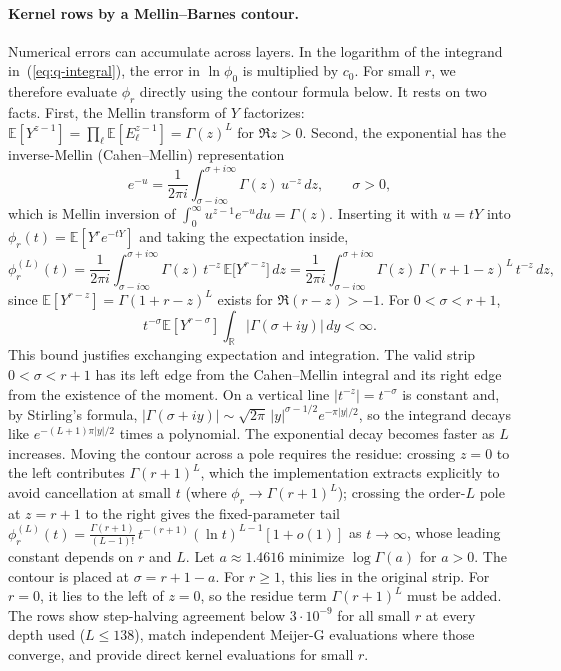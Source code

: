 \documentclass[anon]{alt2027}
\newcommand{\E}{\mathbb{E}}
\renewcommand{\eqref}[1]{(\ref{#1})}
\begin{document}
\paragraph{Kernel rows by a Mellin--Barnes contour.} Numerical errors can accumulate across layers. In the logarithm of the integrand in~\eqref{eq:q-integral}, the error in $\ln\phi_0$ is multiplied by $c_0$. For small $r$, we therefore evaluate $\phi_r$ directly using the contour formula below. It rests on two facts. First, the Mellin transform of $Y$ factorizes: $\E[Y^{z-1}]=\prod_{\ell}\E[E_\ell^{z-1}]=\Gamma(z)^L$ for $\Re z>0$. Second, the exponential has the inverse-Mellin (Cahen--Mellin) representation
\begin{equation}
e^{-u}=\frac{1}{2\pi i}\int_{\sigma-i\infty}^{\sigma+i\infty}\Gamma(z)\,u^{-z}\,dz,\qquad \sigma>0,
\end{equation}
which is Mellin inversion of $\int_0^\infty u^{z-1}e^{-u}du=\Gamma(z)$. Inserting it with $u=tY$ into $\phi_r(t)=\E[Y^re^{-tY}]$ and taking the expectation inside,
\begin{equation}
\label{eq:mb}
\phi_r^{(L)}(t)=\frac1{2\pi i}\int_{\sigma-i\infty}^{\sigma+i\infty}\Gamma(z)\,t^{-z}\,\E\bigl[Y^{r-z}\bigr]\,dz=\frac1{2\pi i}\int_{\sigma-i\infty}^{\sigma+i\infty}\Gamma(z)\,\Gamma(r+1-z)^L\,t^{-z}\,dz,
\end{equation}
since $\E[Y^{r-z}]=\Gamma(1+r-z)^L$ exists for $\Re(r-z)>-1$. For $0<\sigma<r+1$, \[t^{-\sigma}\E[Y^{r-\sigma}]\int_{\mathbb R}|\Gamma(\sigma+iy)|\,dy<\infty.\] This bound justifies exchanging expectation and integration. The valid strip $0<\sigma<r+1$ has its left edge from the Cahen--Mellin integral and its right edge from the existence of the moment. On a vertical line $|t^{-z}|=t^{-\sigma}$ is constant and, by Stirling's formula, $|\Gamma(\sigma+iy)|\sim\sqrt{2\pi}\,|y|^{\sigma-1/2}e^{-\pi|y|/2}$, so the integrand decays like $e^{-(L+1)\pi|y|/2}$ times a polynomial. The exponential decay becomes faster as $L$ increases. Moving the contour across a pole requires the residue: crossing $z=0$ to the left contributes $\Gamma(r+1)^L$, which the implementation extracts explicitly to avoid cancellation at small $t$ (where $\phi_r\to\Gamma(r+1)^L$); crossing the order-$L$ pole at $z=r+1$ to the right gives the fixed-parameter tail $\phi^{(L)}_r(t)=\frac{\Gamma(r+1)}{(L-1)!}\,t^{-(r+1)}(\ln t)^{L-1}[1+o(1)]$ as $t\to\infty$, whose leading constant depends on $r$ and $L$. Let $a\approx1.4616$ minimize $\log\Gamma(a)$ for $a>0$. The contour is placed at $\sigma=r+1-a$. For $r\ge1$, this lies in the original strip. For $r=0$, it lies to the left of $z=0$, so the residue term $\Gamma(r+1)^L$ must be added. The rows show step-halving agreement below $3\cdot10^{-9}$ for all small $r$ at every depth used ($L\le138$), match independent Meijer-G evaluations where those converge, and provide direct kernel evaluations for small $r$.
\end{document}

